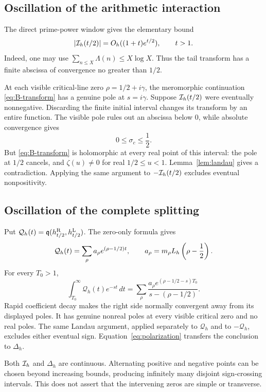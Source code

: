\subsection{Oscillation of the arithmetic interaction}

The direct prime-power window gives the elementary bound
\[
|\mathcal I_h(t/2)|=O_h((1+t)e^{t/2}),\qquad t>1.
\]
Indeed, one may use
\(\sum_{n\le X}\Lambda(n)\le X\log X\).  Thus the tail transform has a
finite abscissa of convergence no greater than \(1/2\).

At each visible critical-line zero \(\rho=1/2+i\gamma\), the meromorphic
continuation \eqref{eq:B-transform} has a genuine pole at \(s=i\gamma\).
Suppose \(\mathcal I_h(t/2)\) were eventually nonnegative.  Discarding the finite
initial interval changes its transform by an entire function.  The visible
pole rules out an abscissa below \(0\), while absolute convergence gives
\[
0\le\sigma_c\le\frac12.
\]
But \eqref{eq:B-transform} is holomorphic at every real point of this
interval: the pole at \(1/2\) cancels, and
\(\zeta(u)\ne0\) for real \(1/2\le u<1\).  Lemma~\ref{lem:landau} gives a
contradiction.  Applying the same argument to \(-\mathcal I_h(t/2)\) excludes
eventual nonpositivity.

\subsection{Oscillation of the complete splitting}

Put \(\mathcal Q_h(t)=\mathfrak q(h_{t/2}^{\mathrm R},
h_{t/2}^{\mathrm L})\).  The zero-only formula gives
\[
\mathcal Q_h(t)=
\sum_\rho a_\rho e^{(\rho-1/2)t},
\qquad
a_\rho=m_\rho L_h\left(\rho-\frac12\right).
\]
For every \(T_0>1\),
\[
\int_{T_0}^{\infty}\mathcal Q_h(t)e^{-st}\,dt
=
\sum_\rho
\frac{
a_\rho e^{(\rho-1/2-s)T_0}
}{
s-(\rho-1/2)
}.
\]
Rapid coefficient decay makes the right side normally convergent away
from its displayed poles.  It has genuine nonreal poles at every visible
critical zero and no real poles.  The same Landau argument, applied
separately to \(\mathcal Q_h\) and to \(-\mathcal Q_h\), excludes either
eventual sign.  Equation~\eqref{eq:polarization} transfers the conclusion to
\(\Delta_h\).

Both \(\mathcal I_h\) and \(\Delta_h\) are continuous.  Alternating positive and
negative points can be chosen beyond increasing bounds, producing
infinitely many disjoint sign-crossing intervals.  This does not assert
that the intervening zeros are simple or transverse.
